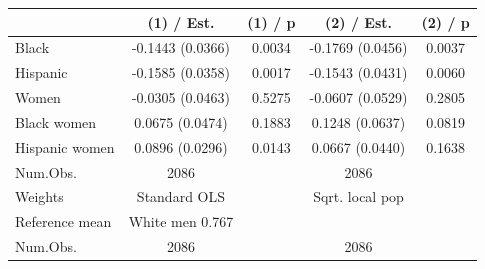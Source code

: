 
\begin{tabular}[t]{lcccc}
\toprule
  & (1) / Est. & (1) / p & (2) / Est. & (2) / p\\
\midrule
Black & -0.1443 
(0.0366) & 0.0034 & -0.1769 
(0.0456) & 0.0037\\
Hispanic & -0.1585 
(0.0358) & 0.0017 & -0.1543 
(0.0431) & 0.0060\\
Women & -0.0305 
(0.0463) & 0.5275 & -0.0607 
(0.0529) & 0.2805\\
Black women & 0.0675 
(0.0474) & 0.1883 & 0.1248 
(0.0637) & 0.0819\\
Hispanic women & 0.0896 
(0.0296) & 0.0143 & 0.0667 
(0.0440) & 0.1638\\
\midrule
Num.Obs. & 2086 &  & 2086 \vphantom{1} & \\
Weights & Standard OLS &  & Sqrt. local pop & \\
Reference mean & White men 0.767 &  &  & \\
Num.Obs. & 2086 &  & 2086 & \\
\bottomrule
\end{tabular}
